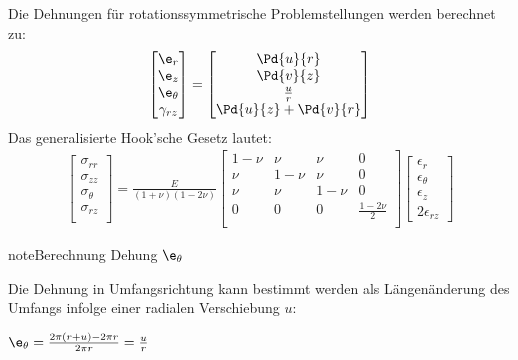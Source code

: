 \documentclass[letterpaper,10pt,german]{jupyterBook}
\begin{document}
\sphinxAtStartPar
Die Dehnungen für rotationssymmetrische Problemstellungen werden berechnet zu:
\begin{equation}\label{equation:chapters/chapter1/elasticity:rotsymstrain}
\begin{split}\begin{bmatrix}
\e_{r} \\
\e_z \\
\e_{\theta} \\
\gamma_{rz}
\end{bmatrix} = \begin{bmatrix}
\Pd{u}{r} \\
\Pd{v}{z} \\
\frac{u}{r} \\
\Pd{u}{z} + \Pd{v}{r}
\end{bmatrix} \end{split}
\end{equation}
\sphinxAtStartPar
Das generalisierte Hook’sche Gesetz lautet:
\begin{equation}\label{equation:chapters/chapter1/elasticity:generalHookRotsym}
\begin{split}\begin{bmatrix} 
\sigma_{rr} \\
\sigma_{zz} \\
\sigma_{\theta} \\
\sigma_{rz} \\
\end{bmatrix} = \frac{E}{(1+\nu)(1-2\nu)}\begin{bmatrix}
1-\nu & \nu & \nu & 0  \\
\nu & 1-\nu & \nu & 0  \\
\nu & \nu & 1-\nu & 0  \\
0 & 0 & 0 & \frac{1-2\nu}{2} \\
\end{bmatrix} \begin{bmatrix} \epsilon_{r} \\ \epsilon_{\theta} \\ \epsilon_{z} \\ 2\epsilon_{rz}  \end{bmatrix}\end{split}
\end{equation}
\begin{sphinxadmonition}{note}{Berechnung Dehung \protect\(\e_{\theta}\protect\)}

\sphinxAtStartPar
Die Dehnung in Umfangsrichtung kann bestimmt werden als Längenänderung des Umfangs infolge einer radialen Verschiebung \(u\):

\sphinxAtStartPar
\(
\e_{\theta} = \frac{2 \pi (r+u) -2\pi r}{2\pi r} = \frac{u}{r}
\)
\end{sphinxadmonition}
\end{document}

